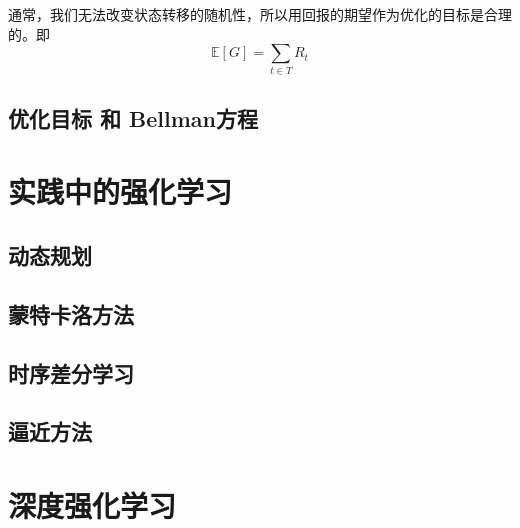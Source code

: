 通常，我们无法改变状态转移的随机性，所以用回报的期望作为优化的目标是合理的。即
\begin{equation}
    \mathbb{E} [G] = \sum_{t \in T} R_t
\end{equation}

\subsection{优化目标 和 Bellman方程}



\section{实践中的强化学习}
\subsection{动态规划}

\subsection{蒙特卡洛方法}


\subsection{时序差分学习}

\subsection{逼近方法}

\section{深度强化学习}



